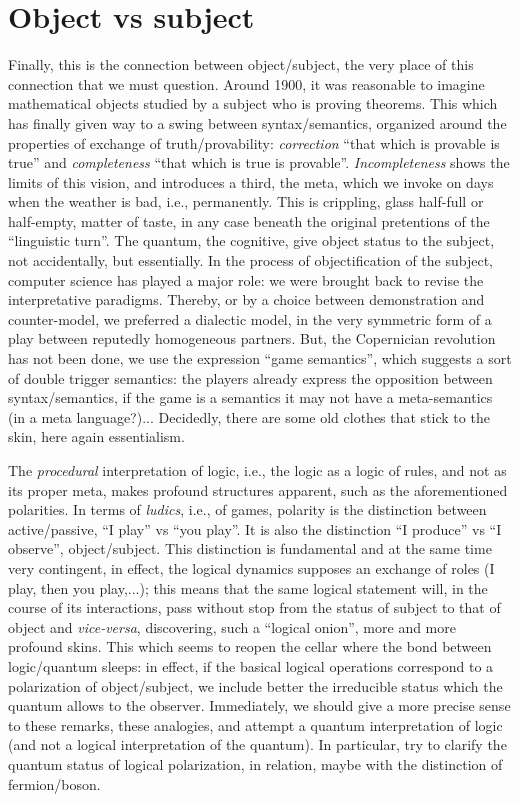 \documentclass{article}
\begin{document}
\section{Object vs subject}
Finally, this is the connection between object/subject, the very place of this connection that we must question. Around 1900, it was reasonable to imagine mathematical objects studied by a subject who is proving theorems. This which has finally given way to a swing between syntax/semantics, organized around the properties of exchange of truth/provability: \emph{correction} \enquote{that which is provable is true} and \emph{completeness} \enquote{that which is true is provable}. \emph{Incompleteness} shows the limits of this vision, and introduces a third, the meta, which we invoke on days when the weather is bad, i.e., permanently. This is crippling, glass half-full or half-empty, matter of taste, in any case beneath the original pretentions of the \enquote{linguistic turn}. The quantum, the cognitive, give object status to the subject, not accidentally, but essentially. In the process of objectification of the subject, computer science has played a major role: we were brought back to revise the interpretative paradigms. Thereby, or by a choice between demonstration and counter-model, we preferred a dialectic model, in the very symmetric form of a play between reputedly homogeneous partners. But, the Copernician revolution has not been done, we use the expression \enquote{game semantics}, which suggests a sort of double trigger semantics: the players already express the opposition between syntax/semantics, if the game is a semantics it may not have a meta-semantics (in a meta language?)... Decidedly, there are some old clothes that stick to the skin, here again essentialism.

The \emph{procedural} interpretation of logic, i.e., the logic as a logic of rules, and not as its proper meta, makes profound structures apparent, such as the aforementioned polarities. In terms of \emph{ludics}, i.e., of games, polarity is the distinction between active/passive, \enquote{I play} vs \enquote{you play}. It is also the distinction \enquote{I produce} vs \enquote{I observe}, object/subject. This distinction is fundamental and at the same time very contingent, in effect, the logical dynamics supposes an exchange of roles (I play, then you play,...); this means that the same logical statement will, in the course of its interactions, pass without stop from the status of subject to that of object and \emph{vice-versa}, discovering, such a \enquote{logical onion}, more and more profound skins. This which seems to reopen the cellar where the bond between logic/quantum sleeps: in effect, if the basical logical operations correspond to a polarization of object/subject, we include better the irreducible status which the quantum allows to the observer. Immediately, we should give a more precise sense to these remarks, these analogies, and attempt a quantum interpretation of logic (and not a logical interpretation of the quantum). In particular, try to clarify the quantum status of logical polarization, in relation, maybe with the distinction of fermion/boson.
\end{document}
